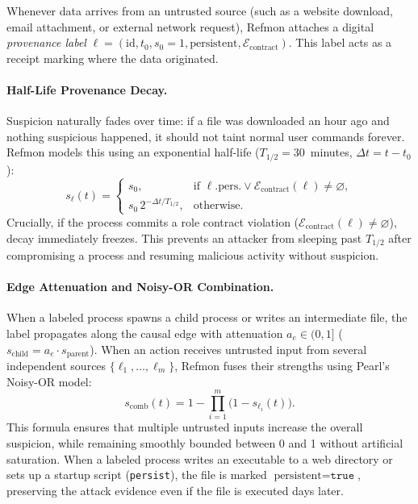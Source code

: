 \documentclass[10pt,twocolumn,letterpaper]{article}
\makeatletter
\theoremstyle{plain}
\theoremstyle{definition}
\theoremstyle{remark}
\DeclareRobustCommand{\_}{\ifmmode\nfss@text{\textunderscore}\else\textunderscore\penalty\@highpenalty\hskip\z@skip\fi}
\makeatother
\begin{document}
Whenever data arrives from an untrusted source (such as a website download, email attachment, or external network request), Refmon attaches a digital \emph{provenance label} $\ell = (\text{id}, t_0, s_0=1, \text{persistent}, \mathcal{E}_{\text{contract}})$. This label acts as a receipt marking where the data originated.

\paragraph{Half-Life Provenance Decay.} Suspicion naturally fades over time: if a file was downloaded an hour ago and nothing suspicious happened, it should not taint normal user commands forever. Refmon models this using an exponential half-life ($T_{1/2} = 30$~minutes, $\Delta t = t - t_0$):
\begin{equation}
  s_\ell(t) =
  \begin{cases}
    s_0, & \text{if } \ell.\text{pers.} \lor \mathcal{E}_{\text{contract}}(\ell) \neq \varnothing,\\[3pt]
    s_0 \, 2^{-\Delta t / T_{1/2}}, & \text{otherwise.}
  \end{cases}
  \label{eq:decay}
\end{equation}
Crucially, if the process commits a role contract violation ($\mathcal{E}_{\text{contract}}(\ell) \neq \varnothing$), decay immediately freezes. This prevents an attacker from sleeping past $T_{1/2}$ after compromising a process and resuming malicious activity without suspicion.

\paragraph{Edge Attenuation and Noisy-OR Combination.} When a labeled process spawns a child process or writes an intermediate file, the label propagates along the causal edge with attenuation $a_e \in (0, 1]$ ($s_{\text{child}} = a_e \cdot s_{\text{parent}}$). When an action receives untrusted input from several independent sources $\{\ell_1, \dots, \ell_m\}$, Refmon fuses their strengths using Pearl's Noisy-OR model:
\begin{equation}
  s_{\text{comb}}(t) = 1 - \prod_{i=1}^{m} \big(1 - s_{\ell_i}(t)\big).
  \label{eq:noisyor}
\end{equation}
This formula ensures that multiple untrusted inputs increase the overall suspicion, while remaining smoothly bounded between 0 and 1 without artificial saturation. When a labeled process writes an executable to a web directory or sets up a startup script (\texttt{persist}), the file is marked $\text{persistent} = \texttt{true}$, preserving the attack evidence even if the file is executed days later.
\end{document}
